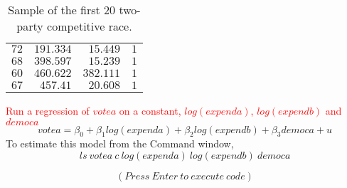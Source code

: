 \documentclass[12pt]{report}
\begin{document}
\begin{table}[H]
\begin{tabular}{lrrr}
		\multicolumn{1}{r}{$72$}&\multicolumn{1}{r}{$191.334$}&\multicolumn{1}{r}{$15.449$}&\multicolumn{1}{r}{$1$}\\
		\multicolumn{1}{r}{$68$}&\multicolumn{1}{r}{$398.597$}&\multicolumn{1}{r}{$15.239$}&\multicolumn{1}{r}{$1$}\\
		\multicolumn{1}{r}{$60$}&\multicolumn{1}{r}{$460.622$}&\multicolumn{1}{r}{$382.111$}&\multicolumn{1}{r}{$1$}\\
		\multicolumn{1}{r}{$67$}&\multicolumn{1}{r}{$457.41$}&\multicolumn{1}{r}{$20.608$}&\multicolumn{1}{r}{$1$}\\
	\end{tabular}
	\caption{Sample of the first 20 two-party competitive race.}
\end{table}


\newpage
\noindent \textcolor{red}
{
	Run a regression of $votea$ on a constant, $log(expenda)$, $log(expendb)$ and $democa$
}
$$votea = \beta_0 + \beta_1log(expenda) + \beta_2log(expendb) + \beta_3democa + u $$
\noindent To estimate this model from the Command window,
$$ls\ votea\ c\ log(expenda)\ log(expendb)\ democa$$
\begin{figure}[H]
	\centering
\end{figure}
\vspace{-\baselineskip}
$$(Press\ Enter\ to\ execute\ code)$$
\end{document}
